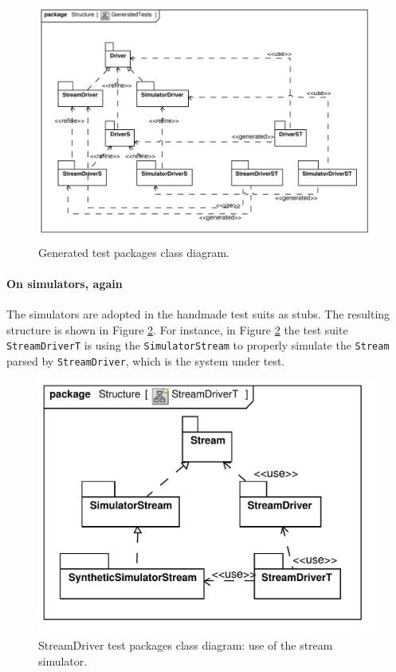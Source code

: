 \documentclass[english]{lni}
\newcommand{\lil}[1]{\texttt{\lstinline|#1|}}
\begin{document}
\begin{figure}[htb!]
  \centering
  \includegraphics[scale=0.7]{UML_model/Class_Diagram__Structure__GeneratedTests}
  \caption{Generated test packages class diagram.}
  \label{fig:class_diagram_generatedtest}
\end{figure}

\paragraph*{On simulators, again}

The simulators are adopted in the handmade test suits as stubs.
The resulting structure is shown in Figure \ref{fig:class_diagram_streamdriver_test}.  
For instance, in Figure \ref{fig:class_diagram_streamdriver_test} the test suite \lil{StreamDriverT} is using the \lil{SimulatorStream} to properly simulate the \lil{Stream} parsed by \lil{StreamDriver}, which is the system under test.

\begin{figure}[htb!]
  \centering
  \includegraphics[scale=0.4]{UML_model/Class_Diagram__Structure__StreamDriverT}
  \caption{StreamDriver test packages class diagram: use of the stream
    simulator.}
  \label{fig:class_diagram_streamdriver_test}
\end{figure}
\end{document}
